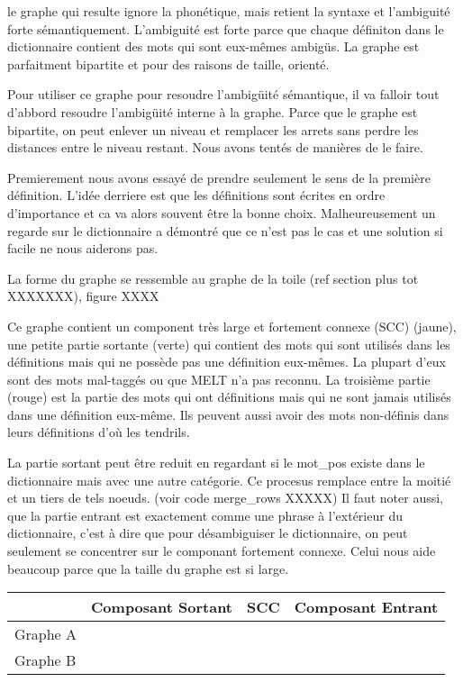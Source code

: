 le graphe qui resulte ignore la phonétique, mais retient la syntaxe et
l'ambiguité forte sémantiquement. L'ambiguité est forte parce que chaque
définiton dans le dictionnaire contient des mots qui sont eux-mêmes
ambigüs. La graphe est parfaitment bipartite
et pour des raisons de taille, orienté. 

Pour utiliser ce graphe pour resoudre l'ambigüité sémantique, il va
falloir tout d'abbord resoudre l'ambigüité interne à la graphe.
Parce que le graphe est bipartite, on peut enlever un niveau et remplacer
les arrets sans perdre les distances entre le niveau restant. Nous avons
tentés de manières de le faire.

Premierement nous avons essayé de prendre seulement le sens de la
première définition. L'idée derriere est que les définitions sont écrites en
ordre d'importance et ca va alors souvent être la bonne choix. Malheureusement
un regarde sur le dictionnaire a démontré que ce n'est pas le cas et une
solution si facile ne nous aiderons pas.

La forme du graphe se ressemble au graphe de la toile (ref section plus tot
XXXXXXX), figure XXXX

\begin{figure}
\centering
\parbox{5cm}{
\def\svgscale{0.5}

\caption{}
\label{fig:graph_shocker}}
\end{figure}

Ce graphe contient un component très large et fortement connexe (SCC) (jaune),
une petite partie sortante (verte) qui contient des mots qui sont
utilisés dans les définitions mais qui ne possède pas une définition
eux-mêmes. La plupart d'eux sont des mots mal-taggés ou que MELT n'a
pas reconnu. La troisième partie (rouge) est la partie des mots qui
ont définitions mais qui ne sont jamais utilisés dans une définition
eux-même. Ils peuvent aussi avoir des mots non-définis dans leurs
définitions d'où les tendrils.

La partie sortant peut être reduit en regardant si le mot\_pos existe
dans le dictionnaire mais avec une autre catégorie. Ce procesus remplace
entre la moitié et un tiers de tels noeuds. (voir code merge\_rows XXXXX)
Il faut noter aussi, que la partie entrant est exactement comme une
phrase à l'extérieur du dictionnaire, c'est à dire que pour désambiguiser
le dictionnaire, on peut seulement se concentrer sur le componant
fortement connexe. Celui nous aide beaucoup parce que la taille du
graphe est si large.

\begin{tabular}{l|c|c|c}
\hline
             & Composant Sortant & SCC & Composant Entrant \\
\hline
Graphe A     &                   &     &                   \\
\hline
Graphe B     &                   &     &                   \\
\hline
\end{tabular}

